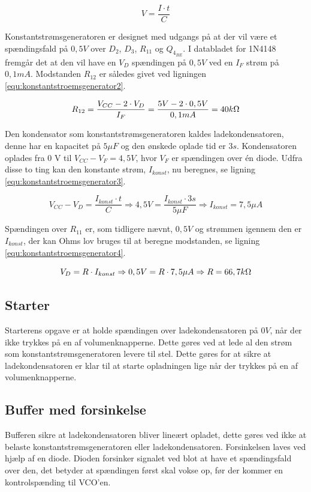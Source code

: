 \begin{equation}
\label{equ:konstantstroemsgenerator1}
V = \frac{I \cdot t}{C}
\end{equation}

Konstantstrømsgeneratoren er designet med udgangs på at der vil være et spændingsfald på $0,5 V$ over $D_2$, $D_3$, $R_{11}$ og $Q_{4_{BE}}$. I databladet for 1N4148 fremgår det at den vil have en $V_D$ spændingen på $0,5 V$ ved en $I_F$ strøm på $0,1 mA$. Modstanden $R_{12}$ er således givet ved ligningen \ref{equ:konstantstroemsgenerator2}.

\begin{equation}
\label{equ:konstantstroemsgenerator2}
R_{12} = \frac{V_{CC} - 2 \cdot V_D}{I_F} = \frac{5V - 2 \cdot 0,5 V}{0,1 mA} = 40 k\ohm
\end{equation}

Den kondensator som konstantstrømsgeneratoren kaldes ladekondensatoren, denne har en kapacitet på $5 \mu F$ og den ønskede oplade tid er $3 s$. Kondensatoren oplades fra 0 V til $V_{CC} - V_F = 4,5 V$, hvor $V_F$ er spændingen over én diode. Udfra disse to ting kan den konstante strøm, $I_{konst}$, nu beregnes, se ligning \ref{equ:konstantstroemsgenerator3}.

\begin{equation}
\label{equ:konstantstroemsgenerator3}
V_{CC} - V_D = \frac{I_{konst} \cdot t}{C} \Rightarrow 4,5 V = \frac{I_{konst} \cdot 3 s}{5 \mu F} \Rightarrow I_{konst} = 7,5 \mu A
\end{equation}

Spændingen over $R_{11}$ er, som tidligere nævnt, $0,5 V$ og strømmen igennem den er $I_{konst}$, der kan Ohms lov bruges til at beregne modstanden, se ligning \ref{equ:konstantstroemsgenerator4}.

\begin{equation}
\label{equ:konstantstroemsgenerator4}
V_D = R \cdot I_{konst} \Rightarrow 0,5 V = R \cdot 7,5 \mu A \Rightarrow R = 66,7 k\ohm
\end{equation}

\subsection{Starter}
\label{volumenkontrol-simulering-starter}

Starterens opgave er at holde spændingen over ladekondensatoren på $0 V$, når der ikke trykkes på en af volumenknapperne. Dette gøres ved at lede al den strøm som konstantstrømsgeneratoren levere til stel. Dette gøres for at sikre at ladekondensatoren er klar til at starte opladningen lige når der trykkes på en af volumenknapperne.

\subsection{Buffer med forsinkelse}
\label{volumenkontrol-simulering-buffer}

Bufferen sikre at ladekondensatoren bliver lineært opladet, dette gøres ved ikke at belaste konstantstrømsgeneratoren eller ladekondensatoren. Forsinkelsen laves ved hjælp af en diode. Dioden forsinker signalet ved blot at have et spændingsfald over den, det betyder at spændingen først skal vokse op, før der kommer en kontrolspænding til VCO'en.

